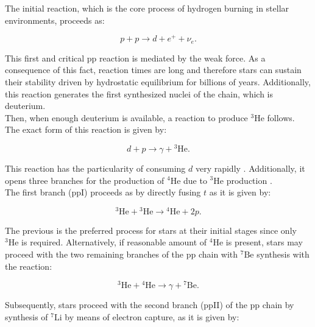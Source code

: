 \documentclass[openany]{book}
\begin{document}
The initial reaction, which is the core process of hydrogen burning in stellar environments, proceeds as:  

\begin{equation} \label{eq:reaction_ppMain}
	p + p \rightarrow d + e^{+} + \nu_e.
\end{equation}

This first and critical pp reaction is mediated by the weak force. As a consequence of this fact, reaction times are long and therefore stars can sustain their stability driven by hydrostatic equilibrium for billions of years. Additionally, this reaction generates the first synthesized nuclei of the chain, which is deuterium. \\

Then, when enough deuterium is available, a reaction to produce ${}^{3} \mathrm{He}$ follows. The exact form of this reaction is given by: 

\begin{equation} \label{eq:reaction_2Hpgamma3He}
	d + p  \rightarrow \gamma + {}^{3} \mathrm{He}.
\end{equation}

This reaction has the particularity of consuming $d$ very rapidly \cite{bertulani_2003}. Additionally, it opens three branches for the production of $\mathrm{{}^{4}He}$ due to ${}^{3} \mathrm{He}$ production \cite{fowler_1958}.\\

The first branch (ppI) proceeds as by directly fusing $t$ as it is given by: 

\begin{equation} \label{eq:reaction_3Hep3He}
	 {}^{3} \mathrm{He} +  {}^{3} \mathrm{He} \rightarrow {}^{4}\mathrm{He} + 2p.
\end{equation}

The previous is the preferred process for stars at their initial stages since only $ {}^{3} \mathrm{He} $ is required. Alternatively, if reasonable amount of ${}^{4}\mathrm{He}$ is present, stars may proceed with the two remaining branches of the pp chain with $\mathrm{{}^{7}Be}$ synthesis with the reaction: 

\begin{equation}  \label{eq:reaction_3He4He}
	{}^{3}\mathrm{He} +{}^{4}\mathrm{He} \rightarrow \gamma +  \mathrm{{}^{7}Be} .
\end{equation}

Subsequently, stars proceed with the second branch (ppII)  of the pp chain by synthesis of $\mathrm{{}^{7}Li}$ by means of electron capture, as it is given by:
\end{document}
